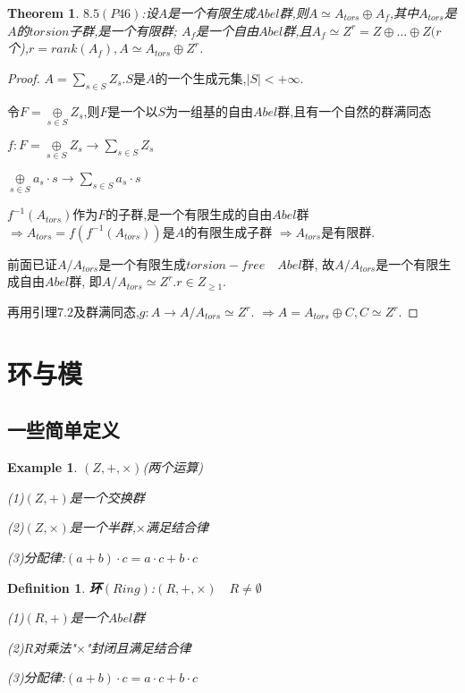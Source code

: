 \documentclass[UTF8]{article}
\newtheorem{thm}{Theorem}[section]
\newtheorem{defn}{Definition}[section]
\newtheorem{exa}{Example}[section]
\begin{document}
\begin{thm}
	\textbf{$8.5(P46)$}:设$A$是一个有限生成$Abel$群,则$A\simeq A_{tors}\oplus A_f$,其中$A_{tors}$是$A$的$torsion$子群,是一个有限群;
	$A_f$是一个自由$Abel$群,且$A_f\simeq Z^r=Z\oplus\dots\oplus Z(r$个),$r=rank(A_f),A\simeq A_{tors}\oplus Z^r$.
\end{thm}
\begin{proof}
	$A=\sum\limits_{s\in S} Z_s.S$是$A$的一个生成元集,$|S|<+\infty$.
	
	令$F=\mathop{\oplus}\limits_{s\in S} Z_s$,则$F$是一个以$S$为一组基的自由$Abel$群,且有一个自然的群满同态
	\begin{center}
		$f:F=\mathop{\oplus}\limits_{s\in S} Z_s\rightarrow \sum\limits_{s\in S} Z_s$
		
		$\mathop{\oplus}\limits_{s\in S} a_s\cdot s\rightarrow \sum\limits_{s\in S} a_s\cdot s$
		
	\end{center}
	
	$f^{-1}(A_{tors})$作为$F$的子群,是一个有限生成的自由$Abel$群
	$\Rightarrow A_{tors}=f(f^{-1}(A_{tors}))$是$A$的有限生成子群
	$\Rightarrow A_{tors}$是有限群.
	
	前面已证$A/A_{tors}$是一个有限生成$torsion-free\quad Abel$群,
	故$A/A_{tors}$是一个有限生成自由$Abel$群,
	即$A/A_{tors}\simeq Z^r.r\in Z_{\geq 1}$.
	
	再用引理$7.2$及群满同态,$g:A\rightarrow A/A_{tors}\simeq Z^r$.
	$\Rightarrow A=A_{tors}\oplus C,C\simeq Z^r$.
	
	
\end{proof}




\section{环与模}
\subsection{一些简单定义}
\normalsize
\begin{exa}
	$(Z,+,\times)$(两个运算)
	
	(1)$(Z,+)$是一个交换群
	
	(2)$(Z,\times)$是一个半群,$\times$满足结合律
	
	(3)分配律:$(a+b)\cdot c=a\cdot c+b\cdot c$
\end{exa}

\begin{defn}
	\textbf{环$(Ring)$}:$(R,+,\times)\quad R\neq\emptyset$
	
	(1)$(R,+)$是一个$Abel$群
	
	(2)$R$对乘法"$\times$"封闭且满足结合律
	
	(3)分配律:$(a+b)\cdot c=a\cdot c+b\cdot c$
\end{defn}
\end{document}
